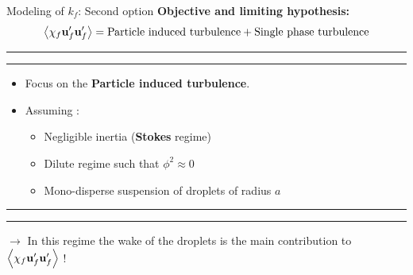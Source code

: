 \documentclass{sintefbeamer}
\begin{document}
\begin{frame}{Modeling of $k_f$: Second option}
  \textbf{Objective and limiting hypothesis:}
  \begin{equation*}
     \left<\chi_f \textbf{u}_f'\textbf{u}_f'\right>
     = 
     \text{Particle induced turbulence}
     + \text{Single phase turbulence}
  \end{equation*}
  \hrule\hrule
  \pause
  \begin{itemize}
    \item 
    Focus on the \textbf{Particle induced turbulence}. 
    \item Assuming : 
    \begin{itemize}
      \item Negligible inertia (\textbf{Stokes} regime)
      \item Dilute regime such that $\phi^{2} \approx 0$ 
      \item Mono-disperse suspension of droplets of radius $a$
    \end{itemize}
  \end{itemize}
\hrule\hrule
$\to$ In this regime the wake of the droplets is the main contribution to  $\left<\chi_f\textbf{u}_f'\textbf{u}_f'\right>$ !
\hfill
\centering
\href{file:///work/fintzin/BUBLLES_PROJECT/movies/layers.mp4}{}
\end{frame}
\end{document}
